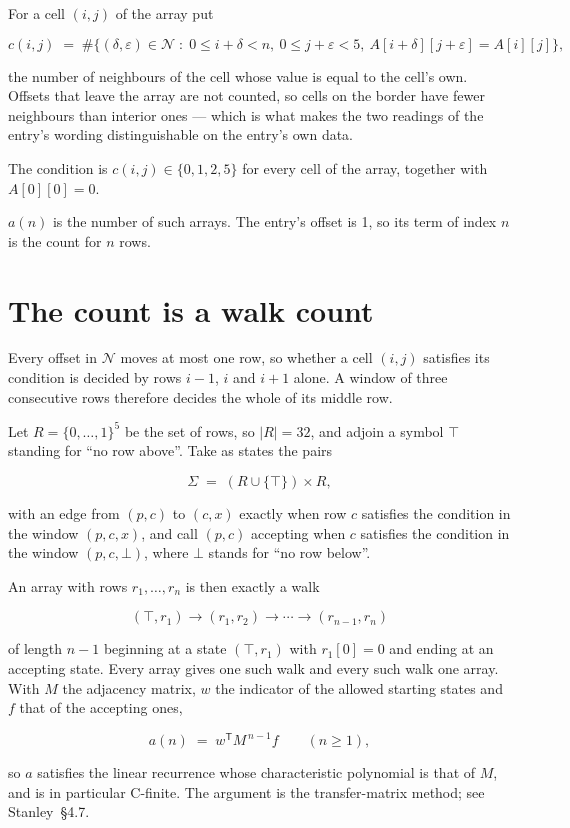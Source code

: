 \documentclass[11pt]{article}
\theoremstyle{definition}
\begin{document}
For a cell $(i,j)$ of the array put

\[c(i,j) \;=\; \#\bigl\{(\delta,\varepsilon)\in\mathcal{N} \;:\; 0\le i+\delta<n,\ 0\le j+\varepsilon<5,\ A[i+\delta][j+\varepsilon] = A[i][j]\bigr\},\]

the number of neighbours of the cell whose value is equal to the cell's own. Offsets that leave the array are not counted, so cells on the border have fewer neighbours than interior ones --- which is what makes the two readings of the entry's wording distinguishable on the entry's own data.

The condition is $c(i,j) \in \{0, 1, 2, 5\}$ for every cell of the array, together with $A[0][0]=0$.

$a(n)$ is the number of such arrays. The entry's offset is 1, so its term of index $n$ is the count for $n$ rows.

\section{The count is a walk count}

Every offset in $\mathcal{N}$ moves at most one row, so whether a cell $(i,j)$ satisfies its condition is decided by rows $i-1$, $i$ and $i+1$ alone. A window of three consecutive rows therefore decides the whole of its middle row.

Let $R = \{0,\dots,1\}^{5}$ be the set of rows, so $|R| = 32$, and adjoin a symbol $\top$ standing for ``no row above''. Take as states the pairs

\[\Sigma \;=\; (R \cup \{\top\}) \times R,\]

with an edge from $(p,c)$ to $(c,x)$ exactly when row $c$ satisfies the condition in the window $(p,c,x)$, and call $(p,c)$ accepting when $c$ satisfies the condition in the window $(p,c,\bot)$, where $\bot$ stands for ``no row below''.

An array with rows $r_1,\dots,r_n$ is then exactly a walk

\[(\top,r_1) \to (r_1,r_2) \to \cdots \to (r_{n-1},r_n)\]

of length $n-1$ beginning at a state $(\top,r_1)$ with $r_1[0]=0$ and ending at an accepting state. Every array gives one such walk and every such walk one array. With $M$ the adjacency matrix, $w$ the indicator of the allowed starting states and $f$ that of the accepting ones,

\[a(n) \;=\; w^{\mathsf T} M^{\,n-1} f \qquad (n \ge 1),\]

so $a$ satisfies the linear recurrence whose characteristic polynomial is that of $M$, and is in particular C-finite. The argument is the transfer-matrix method; see Stanley~\S4.7.
\end{document}
